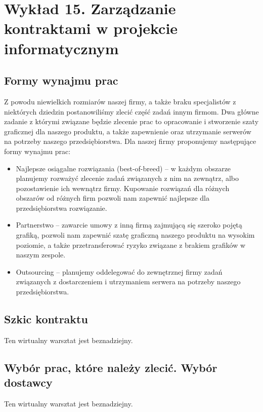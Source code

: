 \chapter{Wykład 15. Zarządzanie kontraktami w projekcie informatycznym}

\section{Formy wynajmu prac}

Z powodu niewielkich rozmiarów naszej firmy, a także braku specjalistów z niektórych dziedzin postanowiliśmy zlecić część zadań innym firmom. Dwa główne zadanie z którymi związane będzie zlecenie prac to opracowanie i stworzenie szaty graficznej dla naszego produktu, a także zapewnienie oraz utrzymanie serwerów na potrzeby naszego przedsiębiorstwa. Dla naszej firmy proponujemy następujące formy wynajmu prac:
\begin{itemize}
\item Najlepsze osiągalne rozwiązania (best-of-breed) – w każdym obszarze planujemy rozważyć zlecenie zadań związanych z nim na zewnątrz, albo pozostawienie ich wewnątrz firmy. Kupowanie rozwiązań dla różnych obszarów od różnych firm pozwoli nam zapewnić najlepsze dla przedsiębiorstwa rozwiązanie.
\item Partnerstwo – zawarcie umowy z inną firmą zajmującą się szeroko pojętą grafiką, pozwoli nam zapewnić szatę graficzną naszego produktu na wysokim poziomie, a także przetransferować ryzyko związane z brakiem grafików w naszym zespole.
\item Outsourcing – planujemy oddelegować do zewnętrznej firmy zadań związanych z dostarczeniem i utrzymaniem serwera na potrzeby naszego przedsiębiorstwa.
\end{itemize}



\section{Szkic kontraktu}

Ten wirtualny warsztat jest beznadziejny.


\section{Wybór prac, które należy zlecić. Wybór dostawcy}

Ten wirtualny warsztat jest beznadziejny.


